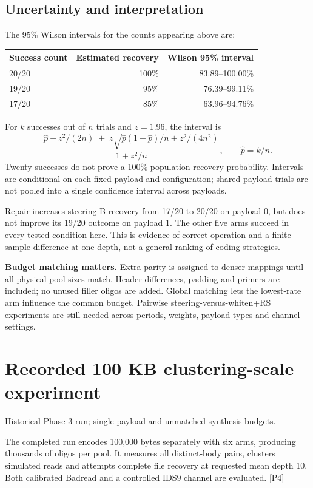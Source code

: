 \documentclass[11pt,a4paper]{article}
\newcommand{\note}[1]{\par\noindent\colorbox{light}{\parbox{\dimexpr\linewidth-2\fboxsep\relax}{\small #1}}\par}
\newcommand{\pageheading}[2]{\clearpage\section{#1}{\color{muted}\small #2}\par\vspace{5pt}}
\begin{document}
\subsection*{Uncertainty and interpretation}
The 95\% Wilson intervals for the counts appearing above are:
\begin{center}\begin{tabular}{lrr}
\toprule Success count & Estimated recovery & Wilson 95\% interval\\\midrule
20/20 & 100\% & 83.89--100.00\%\\
19/20 & 95\% & 76.39--99.11\%\\
17/20 & 85\% & 63.96--94.76\%\\\bottomrule
\end{tabular}\end{center}
For $k$ successes out of $n$ trials and $z=1.96$, the interval is
\[
\frac{\hat p+z^2/(2n)\;\pm\;z\sqrt{\hat p(1-\hat p)/n+z^2/(4n^2)}}{1+z^2/n},
\qquad\hat p=k/n.
\]
Twenty successes do not prove a 100\% population recovery probability. Intervals are
conditional on each fixed payload and configuration; shared-payload trials are not
pooled into a single confidence interval across payloads.

Repair increases steering-B recovery from 17/20 to 20/20 on payload 0, but does not
improve its 19/20 outcome on payload 1. The other five arms succeed in every tested
condition here. This is evidence of correct operation and a finite-sample difference
at one depth, not a general ranking of coding strategies.

\note{\textbf{Budget matching matters.} Extra parity is assigned to denser mappings until
all physical pool sizes match. Header differences, padding and primers are included;
no unused filler oligos are added. Global matching lets the lowest-rate arm influence
the common budget. Pairwise steering-versus-whiten+RS experiments are still needed
across periods, weights, payload types and channel settings.}

\pageheading{Recorded 100 KB clustering-scale experiment}{Historical Phase 3 run; single payload and unmatched synthesis budgets.}
The completed run encodes 100,000 bytes separately with six arms, producing thousands
of oligos per pool. It measures all distinct-body pairs, clusters simulated reads and
attempts complete file recovery at requested mean depth 10. Both calibrated Badread
and a controlled IDS9 channel are evaluated. [P4]
\end{document}
